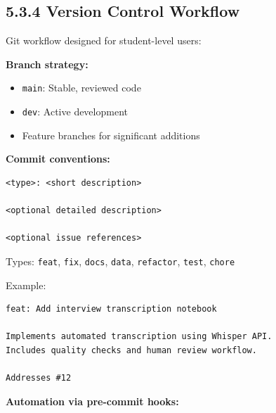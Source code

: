\documentclass[
  oneside,
  open=any]{scrbook}
\providecommand{\tightlist}{%
  \setlength{\itemsep}{0pt}\setlength{\parskip}{0pt}}\usepackage{longtable,booktabs,array}
\begin{document}
\subsection{5.3.4 Version Control
Workflow}\label{version-control-workflow}

Git workflow designed for student-level users:

\textbf{Branch strategy:}

\begin{itemize}
\tightlist
\item
  \texttt{main}: Stable, reviewed code
\item
  \texttt{dev}: Active development
\item
  Feature branches for significant additions
\end{itemize}

\textbf{Commit conventions:}

\begin{verbatim}
<type>: <short description>

<optional detailed description>

<optional issue references>
\end{verbatim}

Types: \texttt{feat}, \texttt{fix}, \texttt{docs}, \texttt{data},
\texttt{refactor}, \texttt{test}, \texttt{chore}

Example:

\begin{verbatim}
feat: Add interview transcription notebook

Implements automated transcription using Whisper API.
Includes quality checks and human review workflow.

Addresses #12
\end{verbatim}

\textbf{Automation via pre-commit hooks:}
\end{document}
